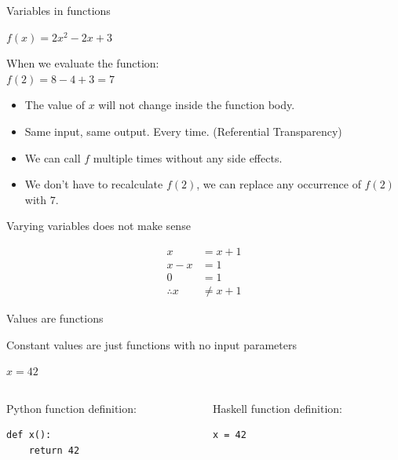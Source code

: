 \documentclass[mathserif]{beamer}
\begin{document}
\begin{frame}{Variables in functions}

  {\Huge $f(x) = 2x^2 - 2x + 3$}

  \vskip5mm

When we evaluate the function:\\
$f(2) = 8 - 4 + 3 = 7$

  \begin{itemize}[<+->]
    \item The value of $x$ will not change inside the function body.
    \item Same input, same output. Every time. (Referential Transparency)
    \item We can call $f$ multiple times without any side effects.
    \item We don't have to recalculate $f(2)$, we can replace any
      occurrence of $f(2)$ with $7$.
  \end{itemize}
\end{frame}

\begin{frame}{Varying variables does not make sense}

  {\Huge
    \begin{align*}
           x     & = x + 1\\
           x - x & = 1\\
           0     & = 1\\
\therefore x     & \neq x + 1
    \end{align*}
  }

\end{frame}

\begin{frame}[fragile]{Values are functions}

  {\large Constant values are just functions with no input parameters}

  \vskip5mm
  {\Huge $x = 42$}
  \vskip10mm

  \begin{columns}[t]
    \begin{column}[T]{5cm}
      Python function definition:
      \begin{verbatim}
def x():
    return 42
      \end{verbatim}
    \end{column}

    \begin{column}[T]{5cm}
       Haskell function definition:
       \begin{verbatim}
x = 42
       \end{verbatim}
    \end{column}
  \end{columns}
\end{frame}
\end{document}
